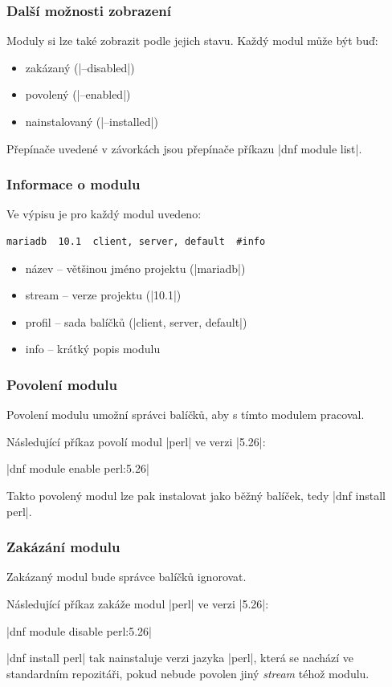 \documentclass[12pt]{beamer}
\begin{document}
\begin{frame}[fragile]
\frametitle{Další možnosti zobrazení}

Moduly si lze také zobrazit podle jejich stavu. Každý modul může být buď:

\begin{itemize}
	\item zakázaný (\tc|--disabled|)
	\item povolený (\tc|--enabled|)
	\item nainstalovaný (\tc|--installed|)
\end{itemize}

Přepínače uvedené v závorkách jsou přepínače příkazu \tc|dnf module list|.
\end{frame}

\begin{frame}[fragile]
\frametitle{Informace o modulu}
Ve výpisu je pro každý modul uvedeno:

\begin{verbatim}
mariadb  10.1  client, server, default  #info
\end{verbatim}

\begin{itemize}
	\item název -- většinou jméno projektu (\tc|mariadb|)
	\item stream -- verze projektu (\tc|10.1|)
	\item profil -- sada balíčků (\tc|client, server, default|)
	\item info -- krátký popis modulu
\end{itemize}
\end{frame}

\begin{frame}[fragile]
\frametitle{Povolení modulu}
Povolení modulu umožní správci balíčků, aby s tímto modulem pracoval. 

Následující příkaz povolí modul \tc|perl| ve verzi \tc|5.26|:

\begin{center}
	\tc|dnf module enable perl:5.26|
\end{center}

Takto povolený modul lze pak instalovat jako běžný balíček, tedy \tc|dnf install perl|.
\end{frame}

\begin{frame}[fragile]
\frametitle{Zakázání modulu}
Zakázaný modul bude správce balíčků ignorovat. 

Následující příkaz zakáže modul \tc|perl| ve verzi \tc|5.26|:

\begin{center}
	\tc|dnf module disable perl:5.26|
\end{center}

\tc|dnf install perl| tak nainstaluje verzi jazyka \tc|perl|, která se nachází ve standardním repozitáři, pokud nebude povolen jiný \textit{stream} téhož modulu.
\end{frame}
\end{document}
